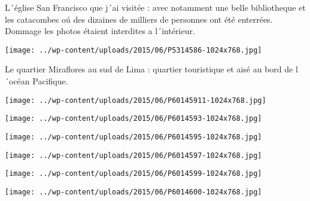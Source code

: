  \pagebreak

L´église San Francisco que j´ai visitée : avec notamment une belle bibliotheque et les catacombes oú des dizaines de milliers de personnes ont été enterrées. Dommage les photos étaient interdites a l´intérieur. 


\begin{center} \texttt{[image: ../wp-content/uploads/2015/06/P5314586-1024x768.jpg]} \end{center}

 

Le quartier Miraflores au sud de Lima : quartier touristique et aisé au bord de l´océan Pacifique. 

 

\begin{center} \texttt{[image: ../wp-content/uploads/2015/06/P60145911-1024x768.jpg]} \end{center}

 

 

\begin{center} \texttt{[image: ../wp-content/uploads/2015/06/P6014593-1024x768.jpg]} \end{center}

 

 

\begin{center} \texttt{[image: ../wp-content/uploads/2015/06/P6014595-1024x768.jpg]} \end{center}

 

 

\begin{center} \texttt{[image: ../wp-content/uploads/2015/06/P6014597-1024x768.jpg]} \end{center}

 

 

\begin{center} \texttt{[image: ../wp-content/uploads/2015/06/P6014599-1024x768.jpg]} \end{center}

 

 

\begin{center} \texttt{[image: ../wp-content/uploads/2015/06/P6014600-1024x768.jpg]} \end{center}

